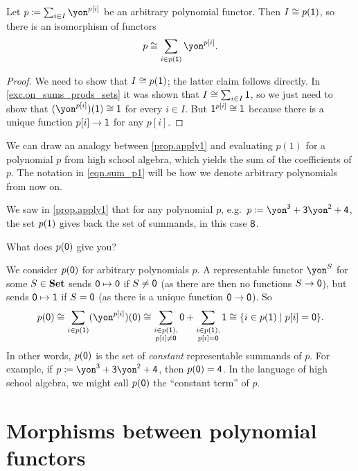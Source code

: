 \documentclass[Book-Poly]{subfiles}
\begin{document}
\begin{proposition}\label{prop.apply1}
Let $p\coloneqq\sum_{i\in I}\yon^{p[i]}$ be an arbitrary polynomial functor. Then $I\cong p(\textsf{1})$, so there is an isomorphism of functors
\begin{equation}\label{eqn.sum_p1}
p\cong\sum_{i\in p(\1)}\yon^{p[i]}.
\end{equation}
\end{proposition}
\begin{proof}
We need to show that $I\cong p(\textsf{1})$; the latter claim follows directly. In \cref{exc.on_sums_prods_sets} it was shown that $I\cong\sum_{i\in I}\textsf{1}$, so we just need to show that $(\yon^{p[i]})(\1)\iso\1$ for every $i \in I$. But $\textsf{1}^{p[i]}\cong \textsf{1}$ because there is a unique function $p[i]\to \textsf{1}$ for any $p[i]$.
\end{proof}
We can draw an analogy between \cref{prop.apply1} and evaluating $p(1)$ for a polynomial $p$ from high school algebra, which yields the sum of the coefficients of $p$.
The notation in \eqref{eqn.sum_p1} will be how we denote arbitrary polynomials from now on.

\begin{exercise}\label{exc.apply0}
We saw in \cref{prop.apply1} that for any polynomial $p$, e.g.\ $p\coloneqq\yon^\3+\3\yon^\2+\4$, the set $p(\textsf{1})$ gives back the set of summands, in this case $\textsf{8}$. 

What does $p(\textsf{0})$ give you?
\begin{solution}
We consider $p(\textsf{0})$ for arbitrary polynomials $p$.
A representable functor $\yon^S$ for some $S \in \mathbf{Set}$ sends $\textsf{0} \mapsto \textsf{0}$ if $S \neq \textsf{0}$ (as there are then no functions $S \to \textsf{0}$), but sends $\textsf{0} \mapsto \textsf{1}$ if $S = \textsf{0}$ (as there is a unique function $\textsf{0} \to \textsf{0}$).
So
\[
    p(\0) \iso \sum_{i \in p(\1)} (\yon^{p[i]})(\0) \iso \sum_{\substack{i \in p(\1), \\ p[i] \neq \0}} \0 + \sum_{\substack{i \in p(\1), \\ p[i] = \0}} \1 \iso \{i \in p(\1) \mid p[i] = \0\}.
\]
In other words, $p(\textsf{0})$ is the set of \emph{constant} representable summands of $p$.
For example, if $p\coloneqq\yon^\3+\3\yon^\2+\4$, then $p(\textsf{0}) = \textsf{4}$.
In the language of high school algebra, we might call $p(\textsf{0})$ the ``constant term'' of $p$.
\end{solution}
\end{exercise}

\section{Morphisms between polynomial functors}
\label{sec.poly.func_nat.morph}
\end{document}
